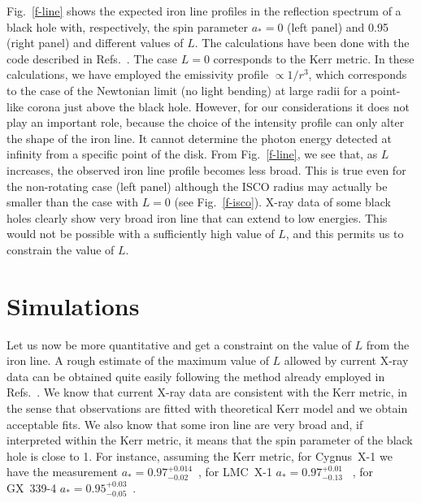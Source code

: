 \documentclass[aps, prd, amsmath, floats, floatfix, twocolumn, nofootinbib, superscriptaddress, showpacs]{revtex4-1}
\begin{document}
Fig.~\ref{f-line} shows the expected iron line profiles in the reflection spectrum of a black hole with, respectively, the spin parameter $a_* = 0$ (left panel) and 0.95 (right panel) and different values of $L$. The calculations have been done with the code described in Refs.~\cite{c1,c2}. The case $L=0$ corresponds to the Kerr metric. In these calculations, we have employed the emissivity profile $\propto 1/r^3$, which corresponds to the case of the Newtonian limit (no light bending) at large radii for a point-like corona just above the black hole. However, for our considerations it does not play an important role, because the choice of the intensity profile can only alter the shape of the iron line. It cannot determine the photon energy detected at infinity from a specific point of the disk. From Fig.~\ref{f-line}, we see that, as $L$ increases, the observed iron line profile becomes less broad. This is true even for the non-rotating case (left panel) although the ISCO radius may actually be smaller than the case with $L=0$ (see Fig.~\ref{f-isco}). X-ray data of some black holes clearly show very broad iron line that can extend to low energies. This would not be possible with a sufficiently high value of $L$, and this permits us to constrain the value of $L$.





\section{Simulations}

Let us now be more quantitative and get a constraint on the value of $L$ from the iron line. A rough estimate of the maximum value of $L$ allowed by current X-ray data can be obtained quite easily following the method already employed in Refs.~\cite{p1,p2,p3,p4}. We know that current X-ray data are consistent with the Kerr metric, in the sense that observations are fitted with theoretical Kerr model and we obtain acceptable fits. We also know that some iron line are very broad and, if interpreted within the Kerr metric, it means that the spin parameter of the black hole is close to 1. For instance, assuming the Kerr metric, for Cygnus~X-1 we have the measurement $a_* = 0.97^{+0.014}_{-0.02}$~\cite{fast1}, for LMC~X-1 $a_* = 0.97^{+ 0.01}_{-0.13}$~\cite{fast2} , for GX~339-4 $a_* = 0.95^{+ 0.03}_{-0.05}$~\cite{fast3}.
 
\end{document}
